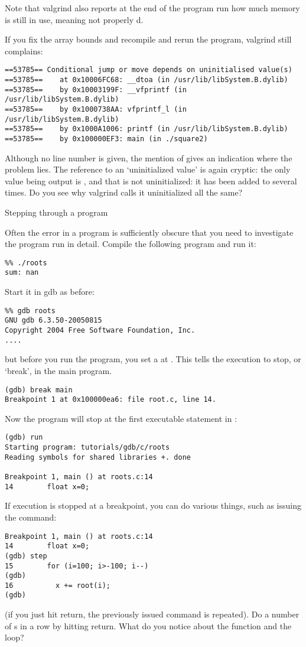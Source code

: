 Note that valgrind also reports at the end of the program run how much
memory is still in use, meaning not properly d.

If you fix the array bounds and recompile and rerun the program,
valgrind still complains:
{\small
\begin{verbatim}
==53785== Conditional jump or move depends on uninitialised value(s)
==53785==    at 0x10006FC68: __dtoa (in /usr/lib/libSystem.B.dylib)
==53785==    by 0x10003199F: __vfprintf (in /usr/lib/libSystem.B.dylib)
==53785==    by 0x1000738AA: vfprintf_l (in /usr/lib/libSystem.B.dylib)
==53785==    by 0x1000A1006: printf (in /usr/lib/libSystem.B.dylib)
==53785==    by 0x100000EF3: main (in ./square2)
\end{verbatim}
}
Although no line number is given, the mention of  gives an
indication where the problem lies.
The reference to an `uninitialized value' is again cryptic: the only
value being output is , and that is not uninitialized: it has
been added to several times. Do you see why valgrind calls it
uninitialized all the same?


 {Stepping through a program}

Often the error in a program is sufficiently obscure that you need to
investigate the program run in detail. Compile the following program
%
%
and run it:
\begin{verbatim}
%% ./roots
sum: nan
\end{verbatim}
Start it in gdb as before:
\begin{verbatim}
%% gdb roots
GNU gdb 6.3.50-20050815 
Copyright 2004 Free Software Foundation, Inc.
....
\end{verbatim}
but before you run the program, you set a 
at .
This tells the execution to stop, or `break', in the main program.
\begin{verbatim}
(gdb) break main
Breakpoint 1 at 0x100000ea6: file root.c, line 14.
\end{verbatim}
Now the program will stop at the first executable statement in :
\begin{verbatim}
(gdb) run
Starting program: tutorials/gdb/c/roots
Reading symbols for shared libraries +. done

Breakpoint 1, main () at roots.c:14
14        float x=0;
\end{verbatim}

If execution is stopped at a breakpoint, you can do various things,
such as issuing the  command:
\begin{verbatim}
Breakpoint 1, main () at roots.c:14
14        float x=0;
(gdb) step
15        for (i=100; i>-100; i--)
(gdb) 
16          x += root(i);
(gdb) 
\end{verbatim}
(if you just hit return, the previously issued command is
repeated). Do a number of s in a row by hitting return. What
do you notice about the function and the loop?

